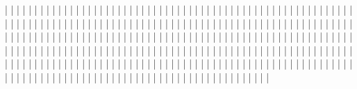 |         |
|         |
|         |
|         |
|         |
|         |
|         |
|         |
|         |
|         |
|         |
|         |
|         |
|         |
|         |
|         |
|         |
|         |
|         |
|         |
|         |
|         |
|         |
|         |
|         |
|         |
|         |
|         |
|         |
|         |
|         |
|         |
|         |
|         |
|         |
|         |
|         |
|         |
|         |
|         |
|         |
|         |
|         |
|         |
|         |
|         |
|         |
|         |
|         |
|         |
|         |
|         |
|         |
|         |
|         |
|         |
|         |
|         |
|         |
|         |
|         |
|         |
|         |
|         |
|         |
|         |
|         |
|         |
|         |
|         |
|         |
|         |
|         |
|         |
|         |
|         |
|         |
|         |
|         |
|         |
|         |
|         |
|         |
|         |
|         |
|         |
|         |
|         |
|         |
|         |
|         |
|         |
|         |
|         |
|         |
|         |
|         |
|         |
|         |
|         |
|         |
|         |
|         |
|         |
|         |
|         |
|         |
|         |
|         |
|         |
|         |
|         |
|         |
|         |
|         |
|         |
|         |
|         |
|         |
|         |
|         |
|         |
|         |
|         |
|         |
|         |
|         |
|         |
|         |
|         |
|         |
|         |
|         |
|         |
|         |
|         |
|         |
|         |
|         |
|         |
|         |
|         |
|         |
|         |
|         |
|         |
|         |
|         |
|         |
|         |
|         |
|         |
|         |
|         |
|         |
|         |
|         |
|         |
|         |
|         |
|         |
|         |
|         |
|         |
|         |
|         |
|         |
|         |
|         |
|         |